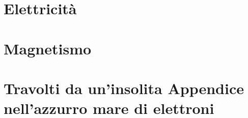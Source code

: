 \documentclass[a4paper, 11pt, twoside, openright, italian]{memoir}
\begin{document}
\frontmatter




\mainmatter
\part{Elettricità}






\part{Magnetismo}






%
\appendix
\part{Travolti da un'insolita Appendice nell'azzurro mare di elettroni}

%

%


\backmatter

\end{document}
